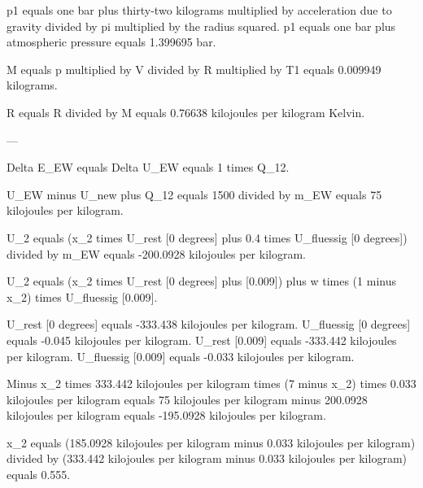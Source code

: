 p1 equals one bar plus thirty-two kilograms multiplied by acceleration due to gravity divided by pi multiplied by the radius squared.  
p1 equals one bar plus atmospheric pressure equals 1.399695 bar.  

M equals p multiplied by V divided by R multiplied by T1 equals 0.009949 kilograms.  

R equals R divided by M equals 0.76638 kilojoules per kilogram Kelvin.  

---

Delta E_EW equals Delta U_EW equals 1 times Q_12.  

U_EW minus U_new plus Q_12 equals 1500 divided by m_EW equals 75 kilojoules per kilogram.  

U_2 equals (x_2 times U_rest [0 degrees] plus 0.4 times U_fluessig [0 degrees]) divided by m_EW equals -200.0928 kilojoules per kilogram.  

U_2 equals (x_2 times U_rest [0 degrees] plus [0.009]) plus w times (1 minus x_2) times U_fluessig [0.009].  

U_rest [0 degrees] equals -333.438 kilojoules per kilogram.  
U_fluessig [0 degrees] equals -0.045 kilojoules per kilogram.  
U_rest [0.009] equals -333.442 kilojoules per kilogram.  
U_fluessig [0.009] equals -0.033 kilojoules per kilogram.  

Minus x_2 times 333.442 kilojoules per kilogram times (7 minus x_2) times 0.033 kilojoules per kilogram equals 75 kilojoules per kilogram minus 200.0928 kilojoules per kilogram equals -195.0928 kilojoules per kilogram.  

x_2 equals (185.0928 kilojoules per kilogram minus 0.033 kilojoules per kilogram) divided by (333.442 kilojoules per kilogram minus 0.033 kilojoules per kilogram) equals 0.555.